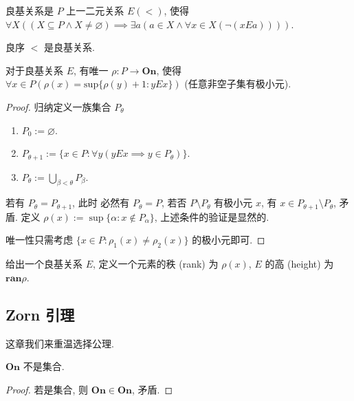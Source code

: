 \begin{definition}
    良基关系是 \(P\) 上一二元关系 \(E (<)\), 使得 \(\forall X ((X \subseteq P \land X \neq \varnothing) \implies \exists a (a \in X \land \forall x \in X (\neg(x E a))))\).
\end{definition}

\begin{example}
    良序 \(<\) 是良基关系.
\end{example}

\begin{theorem}
    对于良基关系 \(E\), 有唯一 \(\rho : P \to \mathbf{On}\), 使得 \(\forall x \in P (\rho(x) = \mathrm{sup} \{\rho(y) + 1 : y E x\})\) (任意非空子集有极小元).

    \begin{proof}
        归纳定义一族集合 \(P_\theta\)

        \begin{enumerate}
            \item \(P_0 := \varnothing\).
            \item \(P_{\theta + 1} := \{x \in P : \forall y (y E x \implies y \in P_\theta)\}\).
            \item \(P_\theta := \bigcup_{\beta < \theta} P_\beta\).
        \end{enumerate}

        若有 \(P_\theta = P_{\theta + 1}\), 此时
        必然有 \(P_\theta = P\), 若否 \(P \setminus P_\theta\) 有极小元 \(x\), 有 \(x \in P_{\theta + 1} \setminus P_{\theta}\), 矛盾.
        定义 \(\rho(x) := \sup \{\alpha : x \notin P_{\alpha}\}\), 上述条件的验证是显然的.

        唯一性只需考虑 \(\{x \in P : \rho_1 (x) \neq \rho_2 (x)\}\) 的极小元即可.
    \end{proof}
\end{theorem}

\begin{definition}
    给出一个良基关系 \(E\), 定义一个元素的秩 (rank) 为 \(\rho(x)\), \(E\) 的高 (height) 为 \(\mathbf{ran} \rho\).
\end{definition}


\subsection{Zorn 引理}

这章我们来重温选择公理.

\begin{lemma}
    \label{lemma:On is not a set}
    \(\mathbf{On}\) 不是集合.

    \begin{proof}
        若是集合, 则 \(\mathbf{On} \in \mathbf{On}\), 矛盾.
    \end{proof}
\end{lemma}

